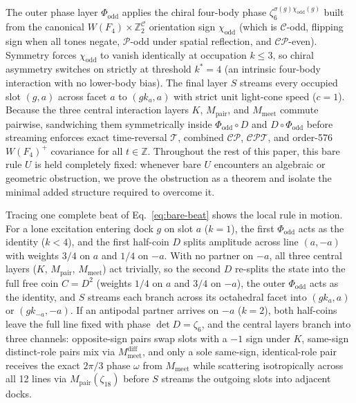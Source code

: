 The outer phase layer $\Phi_{\mathrm{odd}}$ applies the chiral four-body phase $\zeta_6^{\sigma(g)\chi_{\mathrm{odd}}(g)}$
built from the canonical $W(F_4) \times \mathbb{Z}_2^{\mathcal{C}}$ orientation sign $\chi_{\mathrm{odd}}$ (which is
$\mathcal{C}$-odd, flipping sign when all tones negate, $\mathcal{P}$-odd under spatial reflection, and
$\mathcal{CP}$-even). Symmetry forces $\chi_{\mathrm{odd}}$ to vanish identically at occupation $k \le 3$, so chiral
asymmetry switches on strictly at threshold $k^* = 4$ (an intrinsic four-body interaction with no lower-body bias). The
final layer $S$ streams every occupied slot $(g, a)$ across facet $a$ to $(g k_a, a)$ with strict unit light-cone speed
($c = 1$). Because the three central interaction layers $K$, $M_{\mathrm{pair}}$, and $M_{\mathrm{meet}}$ commute
pairwise, sandwiching them symmetrically inside $\Phi_{\mathrm{odd}} \circ D$ and $D \circ \Phi_{\mathrm{odd}}$ before
streaming enforces exact time-reversal $\mathcal{T}$, combined $\mathcal{CP}$, $\mathcal{CPT}$, and order-576
$W(F_4)^+$ covariance for all $t \in \mathbb{Z}$. Throughout the rest of this paper, this bare rule $U$ is held
completely fixed: whenever bare $U$ encounters an algebraic or geometric obstruction, we prove the obstruction as a
theorem and isolate the minimal added structure required to overcome it.

Tracing one complete beat of Eq.~\eqref{eq:bare-beat} shows the local rule in motion. For a lone excitation entering
dock $g$ on slot $a$ ($k = 1$), the first $\Phi_{\mathrm{odd}}$ acts as the identity ($k < 4$), and the first half-coin
$D$ splits amplitude across line $(a, -a)$ with weights $3/4$ on $a$ and $1/4$ on $-a$. With no partner on $-a$, all
three central layers ($K$, $M_{\mathrm{pair}}$, $M_{\mathrm{meet}}$) act trivially, so the second $D$ re-splits the
state into the full free coin $C = D^2$ (weights $1/4$ on $a$ and $3/4$ on $-a$), the outer $\Phi_{\mathrm{odd}}$ acts
as the identity, and $S$ streams each branch across its octahedral facet into $(g k_a, a)$ or $(g k_{-a}, -a)$. If an
antipodal partner arrives on $-a$ ($k = 2$), both half-coins leave the full line fixed with phase $\det D = \zeta_6$,
and the central layers branch into three channels: opposite-sign pairs swap slots with a $-1$ sign under $K$,
same-sign distinct-role pairs mix via $M_{\mathrm{meet}}^{\mathrm{diff}}$, and only a sole same-sign, identical-role
pair receives the exact $2\pi/3$ phase $\omega$ from $M_{\mathrm{meet}}$ while scattering isotropically across all 12
lines via $M_{\mathrm{pair}}(\zeta_{18})$ before $S$ streams the outgoing slots into adjacent docks.

